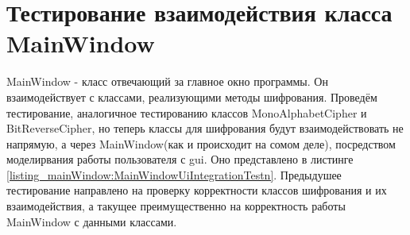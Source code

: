\documentclass[a4paper,12pt]{article}
\begin{document}
\newpage\section{Тестирование взаимодействия класса MainWindow}
MainWindow - класс отвечающий за главное окно программы. Он взаимодействует с классами, реализующими методы шифрования. Проведём тестирование, аналогичное тестированию классов MonoAlphabetCipher и BitReverseCipher, но теперь классы для шифрования будут взаимодействовать не напрямую, а через MainWindow(как и происходит на сомом деле), посредством моделирвания работы пользователя с gui. Оно представлено в листинге \ref{listing_mainWindow:MainWindowUiIntegrationTestn}. Предыдушее тестирование направлено на проверку корректности классов шифрования и их взаимодействия, а такущее преимущественно на корректность работы MainWindow с данными классами.
\end{document}
